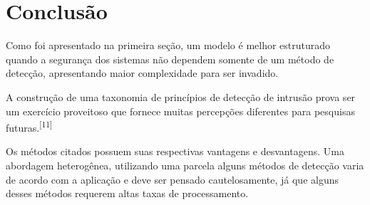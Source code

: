 \documentclass[conference]{IEEEtran}
\begin{document}
\section{Conclusão}
Como foi apresentado na primeira seção, um modelo é melhor estruturado quando a segurança dos sistemas não dependem somente de um método de detecção, apresentando maior complexidade para ser invadido.\par
A construção de uma taxonomia de princípios de detecção de intrusão prova ser um exercício proveitoso que fornece muitas percepções diferentes para pesquisas futuras.\textsuperscript{[11]} \par
Os métodos citados possuem suas respectivas vantagens e desvantagens. Uma abordagem heterogênea, utilizando uma parcela alguns métodos de detecção varia de acordo com a aplicação e deve ser pensado cautelosamente, já que alguns desses métodos requerem altas taxas de processamento. 


\ifCLASSOPTIONcaptionsoff
  \newpage
\fi




\end{document}
